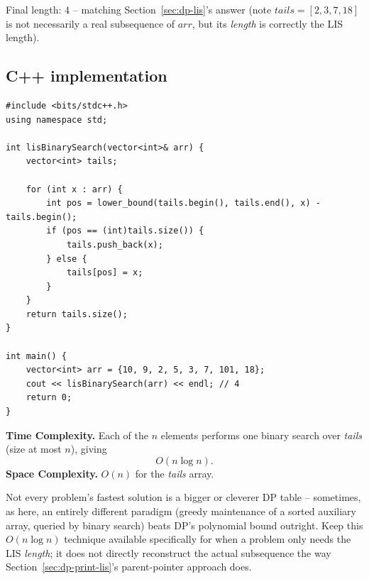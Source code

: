 Final length: $4$ -- matching Section~\ref{sec:dp-lis}'s answer
(note $\textit{tails}=[2,3,7,18]$ is not necessarily a real
subsequence of $\textit{arr}$, but its \emph{length} is correctly the
LIS length).

\subsection*{C++ implementation}

\begin{lstlisting}
#include <bits/stdc++.h>
using namespace std;

int lisBinarySearch(vector<int>& arr) {
    vector<int> tails;

    for (int x : arr) {
        int pos = lower_bound(tails.begin(), tails.end(), x) - tails.begin();
        if (pos == (int)tails.size()) {
            tails.push_back(x);
        } else {
            tails[pos] = x;
        }
    }
    return tails.size();
}

int main() {
    vector<int> arr = {10, 9, 2, 5, 3, 7, 101, 18};
    cout << lisBinarySearch(arr) << endl; // 4
    return 0;
}
\end{lstlisting}

\begin{complexitybox}
\textbf{Time Complexity.} Each of the $n$ elements performs one binary
search over \textit{tails} (size at most $n$), giving
\[
  O(n \log n).
\]
\textbf{Space Complexity.} $O(n)$ for the \textit{tails} array.
\end{complexitybox}

\begin{takeawaybox}
Not every problem's fastest solution is a bigger or cleverer DP table --
sometimes, as here, an entirely different paradigm (greedy maintenance
of a sorted auxiliary array, queried by binary search) beats DP's
polynomial bound outright. Keep this $O(n \log n)$ technique available
specifically for when a problem only needs the LIS \emph{length}; it
does not directly reconstruct the actual subsequence the way
Section~\ref{sec:dp-print-lis}'s parent-pointer approach does.
\end{takeawaybox}

